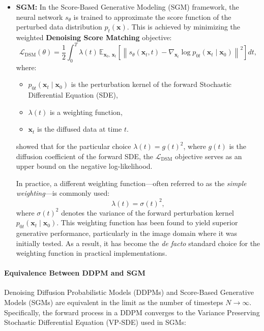 \begin{itemize}
    \item \textbf{SGM:} In the Score-Based Generative Modeling (SGM) framework, the neural network \( s_{\theta} \) is trained to approximate the score function of the perturbed data distribution \( p_t(\mathbf{x}) \). This is achieved by minimizing the weighted \textbf{Denoising Score Matching} objective:
        \[
        \mathcal{L}_{\text{DSM}}(\theta) = \frac{1}{2} \int_0^T \lambda(t) \, \mathbb{E}_{\mathbf{x}_0,\, \mathbf{x}_t} \left[ \left\| s_\theta(\mathbf{x}_t, t) - \nabla_{\mathbf{x}_t} \log p_{0t}(\mathbf{x}_t \mid \mathbf{x}_0) \right\|^2 \right] dt,
        \]
        where:
        \begin{itemize}
            \item \( p_{0t}(\mathbf{x}_t \mid \mathbf{x}_0) \) is the perturbation kernel of the forward Stochastic Differential Equation (SDE),
            \item \( \lambda(t) \) is a weighting function,
            \item \( \mathbf{x}_t \) is the diffused data at time \( t \).
        \end{itemize}

        \cite{song2021maximum} showed that for the particular choice \( \lambda(t) = g(t)^2 \), where \( g(t) \) is the diffusion coefficient of the forward SDE, the \( \mathcal{L}_{\text{DSM}} \) objective serves as an upper bound on the negative log-likelihood.

        In practice, a different weighting function—often referred to as the \emph{simple weighting}—is commonly used:
        \[
        \lambda(t) = \sigma(t)^2,
        \]
        where \( \sigma(t)^2 \) denotes the variance of the forward perturbation kernel \( p_{0t}(\mathbf{x}_t \mid \mathbf{x}_0) \). This weighting function has been found to yield superior generative performance, particularly in the image domain where it was initially tested. As a result, it has become the \emph{de facto} standard choice for the weighting function in practical implementations.

\end{itemize}

\paragraph{Equivalence Between DDPM and SGM}

Denoising Diffusion Probabilistic Models (DDPMs) and Score-Based Generative Models (SGMs) are equivalent in the limit as the number of timesteps \( N \to \infty \). Specifically, the forward process in a DDPM converges to the Variance Preserving Stochastic Differential Equation (VP-SDE) used in SGMs:

